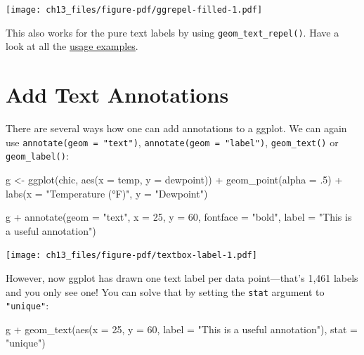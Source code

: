 \documentclass[
  letterpaper,
]{scrbook}
\newenvironment{Shaded}{\begin{snugshade}}{\end{snugshade}}
\newcommand{\AttributeTok}[1]{\textcolor[rgb]{0.40,0.45,0.13}{#1}}
\newcommand{\DecValTok}[1]{\textcolor[rgb]{0.68,0.00,0.00}{#1}}
\newcommand{\FunctionTok}[1]{\textcolor[rgb]{0.28,0.35,0.67}{#1}}
\newcommand{\NormalTok}[1]{\textcolor[rgb]{0.00,0.23,0.31}{#1}}
\newcommand{\OtherTok}[1]{\textcolor[rgb]{0.00,0.23,0.31}{#1}}
\newcommand{\SpecialCharTok}[1]{\textcolor[rgb]{0.37,0.37,0.37}{#1}}
\newcommand{\StringTok}[1]{\textcolor[rgb]{0.13,0.47,0.30}{#1}}
\begin{document}
\texttt{[image: ch13\_files/figure-pdf/ggrepel-filled-1.pdf]}

This also works for the pure text labels by using
\texttt{geom\_text\_repel()}. Have a look at all the
\href{https://ggrepel.slowkow.com/articles/examples.html}{usage
examples}.

\section{Add Text Annotations}\label{add-text-annotations}

There are several ways how one can add annotations to a ggplot. We can
again use \texttt{annotate(geom\ =\ "text")},
\texttt{annotate(geom\ =\ "label")}, \texttt{geom\_text()} or
\texttt{geom\_label()}:

\begin{Shaded}
\begin{Highlighting}[]
\NormalTok{g }\OtherTok{\textless{}{-}}
  \FunctionTok{ggplot}\NormalTok{(chic, }\FunctionTok{aes}\NormalTok{(}\AttributeTok{x =}\NormalTok{ temp, }\AttributeTok{y =}\NormalTok{ dewpoint)) }\SpecialCharTok{+}
  \FunctionTok{geom\_point}\NormalTok{(}\AttributeTok{alpha =}\NormalTok{ .}\DecValTok{5}\NormalTok{) }\SpecialCharTok{+}
  \FunctionTok{labs}\NormalTok{(}\AttributeTok{x =} \StringTok{"Temperature (°F)"}\NormalTok{, }\AttributeTok{y =} \StringTok{"Dewpoint"}\NormalTok{)}

\NormalTok{g }\SpecialCharTok{+} 
  \FunctionTok{annotate}\NormalTok{(}\AttributeTok{geom =} \StringTok{"text"}\NormalTok{, }\AttributeTok{x =} \DecValTok{25}\NormalTok{, }\AttributeTok{y =} \DecValTok{60}\NormalTok{, }\AttributeTok{fontface =} \StringTok{"bold"}\NormalTok{, }
                \AttributeTok{label =} \StringTok{"This is a useful annotation"}\NormalTok{)}
\end{Highlighting}
\end{Shaded}

\texttt{[image: ch13\_files/figure-pdf/textbox-label-1.pdf]}

However, now ggplot has drawn one text label per data point---that's
1,461 labels and you only see one! You can solve that by setting the
\texttt{stat} argument to \texttt{"unique"}:

\begin{Shaded}
\begin{Highlighting}[]
\NormalTok{g }\SpecialCharTok{+}
  \FunctionTok{geom\_text}\NormalTok{(}\FunctionTok{aes}\NormalTok{(}\AttributeTok{x =} \DecValTok{25}\NormalTok{, }\AttributeTok{y =} \DecValTok{60}\NormalTok{,}
                \AttributeTok{label =} \StringTok{"This is a useful annotation"}\NormalTok{),}
            \AttributeTok{stat =} \StringTok{"unique"}\NormalTok{)}
\end{Highlighting}
\end{Shaded}
\end{document}
